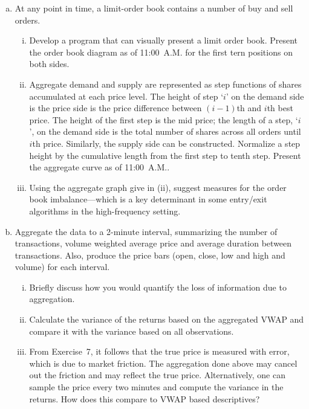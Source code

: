 \begin{enumerate}[1.]
\begin{enumerate}[(a)]
\item At any point in time, a limit-order book contains a number of buy and sell orders.
	\begin{enumerate}[(i)]
	\item Develop a program that can visually present a limit order book. Present the order book diagram as of 11:00~A.M. for the first tern positions on both sides.
	\item Aggregate demand and supply are represented as step functions of shares accumulated at each price level. The height of step `$i$' on the demand side is the price side is the price difference between $(i-1)$th and $i$th best price. The height of the first step is the mid price; the length of a step, `$i$', on the demand side is the total number of shares across all orders until $i$th price. Similarly, the supply side can be constructed. Normalize a step height by the cumulative length from the first step to tenth step. Present the aggregate curve as of 11:00~A.M.. 
	\item Using the aggregate graph give in (ii), suggest measures for the order book imbalance---which is a key determinant in some entry/exit algorithms in the high-frequency setting.
	\end{enumerate}

\item Aggregate the data to a 2-minute interval, summarizing the number of transactions, volume weighted average price and average duration between transactions. Also, produce the price bars (open, close, low and high and volume) for each interval.
	\begin{enumerate}[(i)]
	\item Briefly discuss how you would quantify the loss of information due to aggregation.
	\item Calculate the variance of the returns based on the aggregated VWAP and compare it with the variance based on all observations.
	\item From Exercise~7, it follows that the true price is measured with error, which is due to market friction. The aggregation done above may cancel out the friction and may reflect the true price. Alternatively, one can sample the price every two minutes and compute the variance in the returns. How does this compare to VWAP based descriptives?
	\end{enumerate}
\end{enumerate}



\end{enumerate}